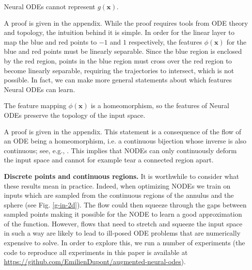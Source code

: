\documentclass{article}
\begin{document}
\begin{prop}
Neural ODEs cannot represent $g(\mathbf{x})$.
\end{prop}

A proof is given in the appendix. While the proof requires tools from ODE theory and topology, the intuition behind it is simple. In order for the linear layer to map the blue and red points to $-1$ and $1$ respectively, the features $\phi(\mathbf{x})$ for the blue and red points must be linearly separable. Since the blue region is enclosed by the red region, points in the blue region must cross over the red region to become linearly separable, requiring the trajectories to intersect, which is not possible. In fact, we can make more general statements about which features Neural ODEs can learn.

\begin{prop}
The feature mapping $\phi(\mathbf{x})$ is a homeomorphism, so the features of Neural ODEs preserve the topology of the input space.
\end{prop}

A proof is given in the appendix. This statement is a consequence of the flow of an ODE being a homeomorphism, i.e. a continuous bijection whose inverse is also continuous; see, e.g., \citep{younes2010shapes}. This implies that NODEs can only continuously deform the input space and cannot for example tear a connected region apart.

\textbf{Discrete points and continuous regions.} It is worthwhile to consider what these results mean in practice. Indeed, when optimizing NODEs we train on inputs which are sampled from the continuous regions of the annulus and the sphere (see Fig. \ref{g-in-2d}). The flow could then squeeze through the gaps between sampled points making it possible for the NODE to learn a good approximation of the function. However, flows that need to stretch and squeeze the input space in such a way are likely to lead to ill-posed ODE problems that are numerically expensive to solve. In order to explore this, we run a number of experiments (the code to reproduce all experiments in this paper is available at \url{https://github.com/EmilienDupont/augmented-neural-odes}).
\end{document}
